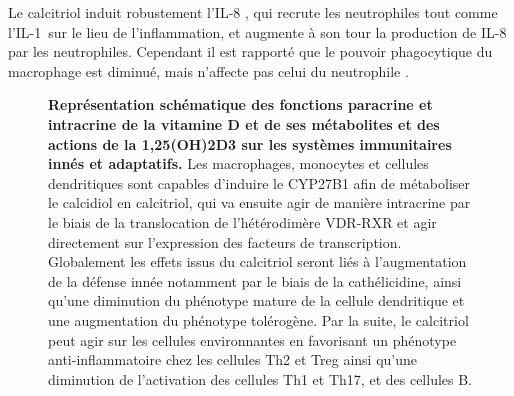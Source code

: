 \documentclass[
  a4paper,
  DIV=11,
  numbers=noendperiod,
  listof=totoc]{scrreprt}
\begin{document}
Le calcitriol induit robustement l'IL-8 \autocite{Bishop.2021}, qui
recrute les neutrophiles tout comme l'IL-1\mupbeta ~sur le lieu de
l'inflammation, et augmente à son tour la production de IL-8 par les
neutrophiles. Cependant il est rapporté que le pouvoir phagocytique du
macrophage est diminué, mais n'affecte pas celui du neutrophile
\autocite{Chen.2017}.

\begin{figure}


\caption[Représentation schématique des fonctions paracrine et
intracrine de la vitamine D et de ses métabolites et des actions de la
\ac{1,25(OH)2D3} sur les systèmes immunitaires innés et
adaptatifs.]{\label{fig-vd-action}\textbf{Représentation schématique des
fonctions paracrine et intracrine de la vitamine D et de ses métabolites
et des actions de la \ac{1,25(OH)2D3} sur les systèmes immunitaires
innés et adaptatifs.} Les macrophages, monocytes et cellules
dendritiques sont capables d'induire le \ac{CYP27B1} afin de métaboliser
le calcidiol en calcitriol, qui va ensuite agir de manière intracrine
par le biais de la translocation de l'hétérodimère \ac{VDR}-\ac{RXR} et
agir directement sur l'expression des facteurs de transcription.
Globalement les effets issus du calcitriol seront liés à l'augmentation
de la défense innée notamment par le biais de la cathélicidine, ainsi
qu'une diminution du phénotype mature de la cellule dendritique et une
augmentation du phénotype tolérogène. Par la suite, le calcitriol peut
agir sur les cellules environnantes en favorisant un phénotype
anti-inflammatoire chez les cellules \ac{Th2} et \ac{Treg} ainsi qu'une
diminution de l'activation des cellules \ac{Th1} et \ac{Th17}, et des
cellules B. \autocite{Charoenngam.2020}}

\end{figure}%
\end{document}
